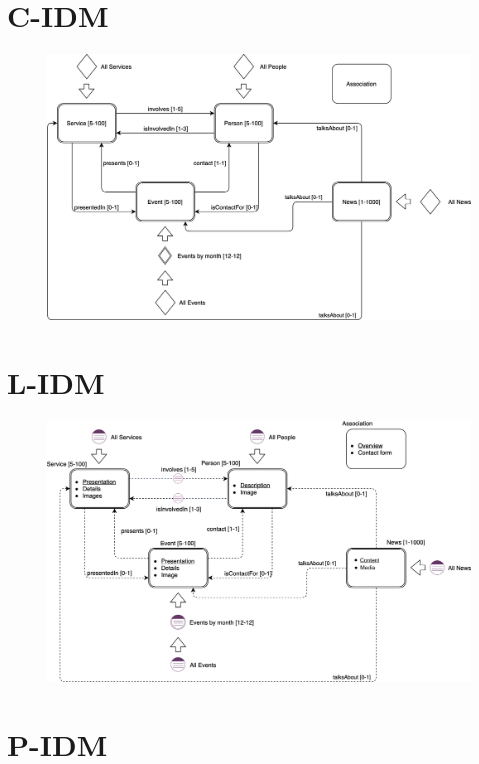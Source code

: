 \documentclass[a4paper, 11pt, parskip=half, headsepline]{scrreprt}
\begin{document}
\section{C-IDM}

\begin{figure}[H]
    \centering
    \includegraphics[width=0.85\linewidth, keepaspectratio]{IDM/C-IDM}
\end{figure}

\newpage
\section{L-IDM}

\begin{figure}[H]
    \centering
    \includegraphics[width=1\linewidth, keepaspectratio]{IDM/L-IDM}
\end{figure}

\newpage
\section{P-IDM}
\end{document}
